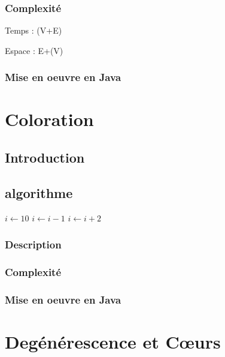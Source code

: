 \subsubsection{Complexité}
Temps : {(\vert V\vert +\vert E\vert )}

Espace : {\vert E\vert +{}(\vert V\vert )}

\subsubsection{Mise en oeuvre en Java }

\begin{figure}[H]
\begin{minipage}{\textwidth}
  \centering
  \label{fig:m}
\end{minipage}
\end{figure}

\newpage

\section{Coloration}
\subsection{Introduction}
\subsection{algorithme}
\begin{algorithmic}
\State $i \gets 10$
    \State $i \gets i-1$
\Else
        \State $i \gets i+2$
    \EndIf
\EndIf
\end{algorithmic}
\subsubsection{Description}
\subsubsection{Complexité}
\subsubsection{Mise en oeuvre en Java }

\newpage

\section{Degénérescence et Cœurs }
